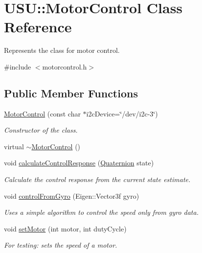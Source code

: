 \hypertarget{class_u_s_u_1_1_motor_control}{\section{\-U\-S\-U\-:\-:\-Motor\-Control \-Class \-Reference}
\label{class_u_s_u_1_1_motor_control}
}


\-Represents the class for motor control.  




{\ttfamily \#include $<$motorcontrol.\-h$>$}

\subsection*{\-Public \-Member \-Functions}
\begin{DoxyCompactItemize}
\item 
\hyperlink{class_u_s_u_1_1_motor_control_a85b6eed3bdd71d61a690395156999888}{\-Motor\-Control} (const char $\ast$i2c\-Device=\char`\"{}/dev/i2c-\/3\char`\"{})
\begin{DoxyCompactList}\small\item\em \-Constructor of the class. \end{DoxyCompactList}\item 
virtual \hyperlink{class_u_s_u_1_1_motor_control_a5bc78d24ed52a012a3f81cd3b62216f3}{$\sim$\-Motor\-Control} ()
\item 
void \hyperlink{class_u_s_u_1_1_motor_control_a40b7e40ce5bfb7fb0dea6c0a75d1eb5e}{calculate\-Control\-Response} (\hyperlink{class_u_s_u_1_1_quaternion}{\-Quaternion} state)
\begin{DoxyCompactList}\small\item\em \-Calculate the control response from the current state estimate. \end{DoxyCompactList}\item 
void \hyperlink{class_u_s_u_1_1_motor_control_a644b231235aecaeea0d18ed2635da15c}{control\-From\-Gyro} (\-Eigen\-::\-Vector3f gyro)
\begin{DoxyCompactList}\small\item\em \-Uses a simple algorithm to control the speed only from gyro data. \end{DoxyCompactList}\item 
void \hyperlink{class_u_s_u_1_1_motor_control_ad08369ed288a7816de1b3c423684f0da}{set\-Motor} (int motor, int duty\-Cycle)
\begin{DoxyCompactList}\small\item\em \-For testing\-: sets the speed of a motor. \end{DoxyCompactList}\item 

\end{DoxyCompactItemize}
